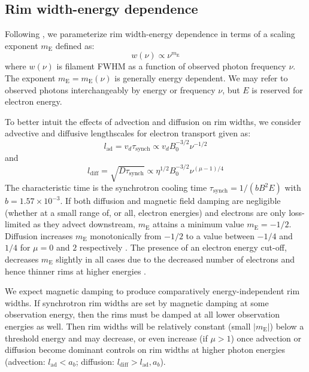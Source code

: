 \documentclass[manuscript]{aastex}  %
\newcommand*{\mt}{\mathrm}
\newcommand*{\tsynch}{\tau_{\mt{synch}}}
\newcommand*{\mE}{m_\mt{E}}
\begin{document}
\subsection{Rim width-energy dependence} \label{sec:energydep}

Following , we parameterize rim width-energy dependence
in terms of a scaling exponent $\mE$ defined as:
\begin{equation}
    w(\nu) \propto \nu^{\mE}
\end{equation}
where $w(\nu)$ is filament FWHM as a function of observed photon frequency
$\nu$.  The exponent $\mE = \mE(\nu)$ is generally energy dependent.  We may
refer to observed photons interchangeably by energy or frequency $\nu$, but $E$
is reserved for electron energy.

To better intuit the effects of advection and diffusion on rim widths, we
consider advective and diffusive lengthscales for electron transport given as:
\begin{equation} \label{eq:lad}
    l_{\mt{ad}} = v_d \tsynch \propto v_d B_0^{-3/2} \nu^{-1/2}
\end{equation}
and
\begin{equation} \label{eq:ldiff}
    l_{\mt{diff}} = \sqrt{D \tsynch} \propto \eta^{1/2} B_0^{-3/2} \nu^{(\mu-1)/4}
\end{equation}
The characteristic time is the synchrotron cooling time
$\tsynch = 1 / (b B^2 E)$ with $b = 1.57 \times 10^{-3}$.
If both diffusion and magnetic field damping are negligible (whether at a small
range of, or all, electron energies) and electrons are only loss-limited as
they advect downstream, $\mE$ attains a minimum value $\mE = -1/2$.  Diffusion
increases $\mE$ monotonically from $-1/2$ to a value between $-1/4$ and $1/4$
for $\mu = 0$ and $2$ respectively .  The
presence of an electron energy cut-off, decreases $\mE$ slightly in all cases
due to the decreased number of electrons and hence thinner rims at higher
energies .

We expect magnetic damping to produce comparatively energy-independent rim
widths.  If synchrotron rim widths are set by magnetic damping
at some observation energy, then the rims must be damped at all lower
observation energies as well.  Then rim widths will be relatively constant
(small $|\mE|$) below a threshold energy and may decrease, or even increase
(if $\mu > 1$) once advection or diffusion become dominant controls on rim
widths at higher photon energies (advection: $l_\mt{ad} < a_b$;
diffusion: $l_{\mt{diff}} > l_{\mt{ad}}, a_b$).
\end{document}
